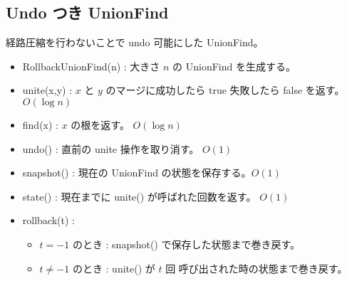 \subsection{Undo つき UnionFind}

経路圧縮を行わないことで undo 可能にした UnionFind。
\begin{itemize}
    \item RollbackUnionFind(n) : 大きさ $n$ の UnionFind を生成する。
    \item unite(x,y) : $x$ と $y$ のマージに成功したら true 失敗したら false を返す。 $O(\log{n})$
    \item find(x) : $x$ の根を返す。 $O(\log{n})$
    \item undo() : 直前の unite 操作を取り消す。 $O(1)$ 
    \item snapshot() : 現在の UnionFind の状態を保存する。$O(1)$
    \item state() : 現在までに unite() が呼ばれた回数を返す。 $O(1)$
    \item rollback(t) : 
    \begin{itemize}
        \item $t = -1$ のとき : snapshot() で保存した状態まで巻き戻す。
        \item $t \neq -1$ のとき : unite() が $t$ 回 呼び出された時の状態まで巻き戻す。
    \end{itemize}
\end{itemize}

